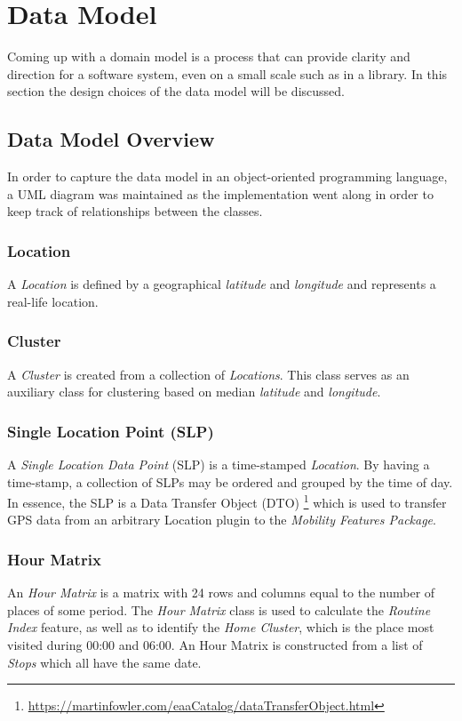 \section{Data Model}
Coming up with a domain model is a process that can provide clarity and direction for a software system, even on a small scale such as in a library. In this section the design choices of the data model will be discussed.

\subsection{Data Model Overview}
In order to capture the data model in an object-oriented programming language, a UML diagram was maintained as the implementation went along in order to keep track of relationships between the classes. 

\subsubsection*{Location}
A \textit{Location} is defined by a geographical \textit{latitude} and \textit{longitude} and represents a real-life location.

\subsubsection*{Cluster}
A \textit{Cluster} is created from a collection of \textit{Locations}. This class serves as an auxiliary class for clustering based on median \textit{latitude} and \textit{longitude}.

\subsubsection*{Single Location Point (SLP)}
A \textit{Single Location Data Point} (SLP) is a time-stamped \textit{Location}. By having a time-stamp, a collection of SLPs may be ordered and grouped by the time of day. In essence, the SLP is a Data Transfer Object (DTO) \footnote{\url{https://martinfowler.com/eaaCatalog/dataTransferObject.html}} which is used to transfer GPS data from an arbitrary Location plugin to the \textit{Mobility Features Package}.

\subsubsection*{Hour Matrix}
An \textit{Hour Matrix} is a matrix with 24 rows and columns equal to the number of places of some period. The \textit{Hour Matrix} class is used to calculate the \textit{Routine Index} feature, as well as to identify the \textit{Home Cluster}, which is the place most visited during 00:00 and 06:00. An Hour Matrix is constructed from a list of \textit{Stops} which all have the same date.

